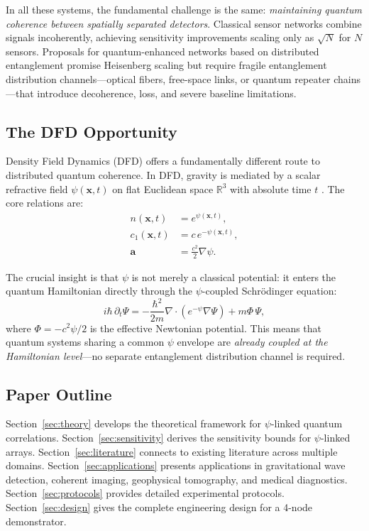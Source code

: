 \documentclass[12pt,a4paper]{article}
\theoremstyle{remark}
\begin{document}
In all these systems, the fundamental challenge is the same: \emph{maintaining
quantum coherence between spatially separated detectors}. Classical sensor
networks combine signals incoherently, achieving sensitivity improvements
scaling only as $\sqrt{N}$ for $N$ sensors. Proposals for quantum-enhanced
networks based on distributed entanglement \cite{Komar2014,Proctor2018,Ge2018}
promise Heisenberg scaling but require fragile entanglement distribution
channels---optical fibers, free-space links, or quantum repeater
chains---that introduce decoherence, loss, and severe baseline limitations.

\subsection{The DFD Opportunity}

Density Field Dynamics (DFD) offers a fundamentally different route to
distributed quantum coherence. In DFD, gravity is mediated by a scalar
refractive field $\psi(\mathbf{x},t)$ on flat Euclidean space
$\mathbb{R}^3$ with absolute time $t$ \cite{Alcock2025DFD}. The core
relations are:
\begin{align}
n(\mathbf{x},t) &= e^{\psi(\mathbf{x},t)}, \label{eq:refractive-index}\\
c_1(\mathbf{x},t) &= c\,e^{-\psi(\mathbf{x},t)}, \label{eq:local-speed}\\
\mathbf{a} &= \frac{c^2}{2}\nabla\psi. \label{eq:acceleration}
\end{align}

The crucial insight is that $\psi$ is not merely a classical potential: it
enters the quantum Hamiltonian directly through the $\psi$-coupled
Schr\"odinger equation:
\begin{equation}
i\hbar\,\partial_t\Psi = -\frac{\hbar^2}{2m}\nabla\cdot\!\left(e^{-\psi}\nabla\Psi\right) + m\Phi\,\Psi,
\label{eq:psi-schrodinger}
\end{equation}
where $\Phi = -c^2\psi/2$ is the effective Newtonian potential. This means
that quantum systems sharing a common $\psi$ envelope are \emph{already
coupled at the Hamiltonian level}---no separate entanglement distribution
channel is required.

\subsection{Paper Outline}

Section~\ref{sec:theory} develops the theoretical framework for
$\psi$-linked quantum correlations. Section~\ref{sec:sensitivity} derives
the sensitivity bounds for $\psi$-linked arrays. Section~\ref{sec:literature}
connects to existing literature across multiple domains.
Section~\ref{sec:applications} presents applications in gravitational wave
detection, coherent imaging, geophysical tomography, and medical diagnostics.
Section~\ref{sec:protocols} provides detailed experimental protocols.
Section~\ref{sec:design} gives the complete engineering design for a 4-node
demonstrator.
\end{document}
